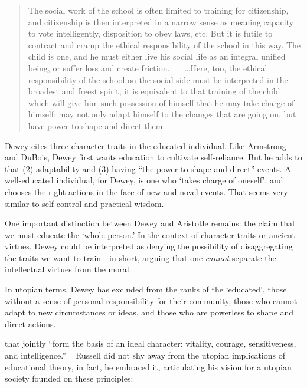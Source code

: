 \begin{quote}

The social work of the school is often limited to training for citizenship, and citizenship is then interpreted in a narrow sense as meaning capacity to vote intelligently, disposition to obey laws, etc. But it is futile to contract and cramp the ethical responsibility of the school in this way. The child is one, and he must either live his social life as an integral unified being, or suffer loss and create friction. ~\citep[p. 10]{Dewey:1903wt}
 
{\ldots}Here, too, the ethical responsibility of the school on the social side must be interpreted in the broadest and freest spirit; it is equivalent to that training of the child which will give him such possession of himself that he may take charge of himself; may not only adapt himself to the changes that are going on, but have power to shape and direct them. ~\citep[p. 12]{Dewey:1903wt}
\end{quote}

Dewey cites three character traits in the educated individual. Like Armstrong and DuBois, Dewey first wants education to cultivate self-reliance. But he adds to that (2) adaptability and (3) having ``the power to shape and direct'' events. A well-educated individual, for Dewey, is one who `takes charge of oneself', and chooses the right actions in the face of new and novel events. That seems very similar to self-control and practical wisdom.

One important distinction between Dewey and Aristotle remains: the claim that we must educate the `whole person.' In the context of character traits or ancient virtues, Dewey could be interpreted as denying the possibility of disaggregating the traits we want to train---in short, arguing that one \emph{cannot} separate the intellectual virtues from the moral. 

In utopian terms, Dewey has excluded from the ranks of the `educated', those without a sense of personal responsibility for their community, those who cannot adapt to new circumstances or ideas, and those who are powerless to shape and direct actions. 

 that jointly ``form the basis of an ideal character: vitality, courage, sensitiveness, and intelligence.'' ~\citep[p.60]{Russell:GWZfGDU3} Russell did not shy away from the utopian implications of educational theory, in fact, he embraced it, articulating his vision for a utopian society founded on these principles:

